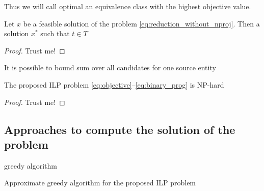 Thus we will call optimal an equivalence class with the highest objective value.

\begin{lemma}
    Let \( x \) be a feasible solution of the problem \eqref{eq:reduction_without_nproj}.
    Then a solution \( x^* \) such that \( t \in T \)
\end{lemma}
\begin{proof}
    Trust me!
\end{proof}

\begin{corollary}
    It is possible to bound sum over all candidates for one source entity
\end{corollary}

\begin{theorem}[]
    The proposed ILP problem \eqref{eq:objective}--\eqref{eq:binary_prog} is NP-hard
\end{theorem}
\begin{proof}
    Trust me!
\end{proof}


\subsection{Approaches to compute the solution of the problem}
greedy algorithm
\begin{algorithm}
    \caption{Approximate greedy algorithm for the proposed ILP problem} \label{alg:ilp_greedy}
\end{algorithm}